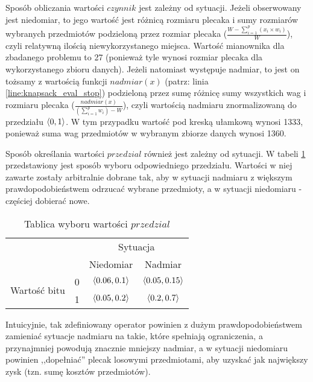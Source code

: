 \documentclass[./FM_mgr.tex]{subfiles}
\begin{document}
	Sposób obliczania wartości $czynnik$ jest zależny od sytuacji. 
	Jeżeli obserwowany jest niedomiar, to jego wartość jest różnicą rozmiaru plecaka i sumy rozmiarów wybranych przedmiotów podzieloną przez rozmiar plecaka ($\frac{W - \sum_{i=1}^p (x_i \times w_i)}{W}$), czyli relatywną ilością niewykorzystanego miejsca. Wartość mianownika dla zbadanego problemu to 27 (ponieważ tyle wynosi rozmiar plecaka dla wykorzystanego zbioru danych).
	Jeżeli natomiast występuje nadmiar, to jest on tożsamy z wartością funkcji $nadmiar(x)$ (patrz: linia \ref{line:knapsack_eval_stop}) podzieloną przez sumę różnicę sumy wszystkich wag i rozmiaru plecaka ($\frac{nadmiar(x)}{(\sum_{i=1}^p w_i) - W}$), czyli wartością nadmiaru znormalizowaną do przedziału $\langle0, 1\rangle$.
	W tym przypadku wartość pod kreską ułamkową wynosi 1333, ponieważ suma wag przedmiotów w wybranym zbiorze danych wynosi 1360.
	
	Sposób określania wartości $przedzial$ również jest zależny od sytuacji. 
	W tabeli \ref{table:range_choose} przedstawiony jest sposób wyboru odpowiedniego przedziału. 
	Wartości w niej zawarte zostały arbitralnie dobrane tak, aby w sytuacji nadmiaru z większym prawdopodobieństwem odrzucać wybrane przedmioty, a w sytuacji niedomiaru - częściej dobierać nowe.
	
	\begin{table}
		\caption{Tablica wyboru wartości $przedzial$ \label{table:range_choose}}
		\centering
		\begin{tabular}{cc|c|c|}
			\cline{3-4}
			\multicolumn{2}{c|}{\multirow{2}{*}{}}                   & \multicolumn{2}{c|}{Sytuacja}              \\ \cline{3-4} 
			\multicolumn{2}{c|}{}                                    & Niedomiar           & Nadmiar              \\ \hline
			\multicolumn{1}{|c|}{\multirow{2}{*}{Wartość bitu}} & 0 & $\langle0.06, 0.1\rangle$ & $\langle0.05, 0.15\rangle$ \\ \cline{2-4} 
			\multicolumn{1}{|c|}{}                              & 1 & $\langle0.05, 0.2\rangle$ & $\langle0.2, 0.7\rangle$   \\ \hline
		\end{tabular}
	\end{table}
	
	Intuicyjnie, tak zdefiniowany operator powinien z dużym prawdopodobieństwem zamieniać sytuacje nadmiaru na takie, które spełniają ograniczenia, a przynajmniej powodują znacznie mniejszy nadmiar, a w sytuacji niedomiaru powinien ,,dopełniać'' plecak losowymi przedmiotami, aby uzyskać jak największy zysk (tzn. sumę kosztów przedmiotów).
	
\end{document}
